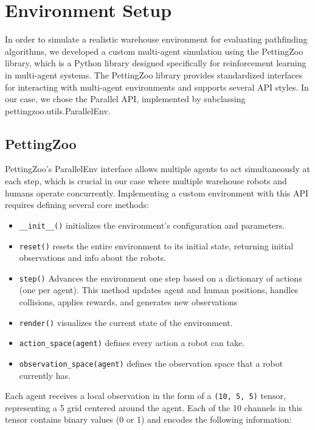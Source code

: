 \documentclass{kththesis}
\begin{document}
\section{Environment Setup}
In order to simulate a realistic warehouse environment for evaluating pathfinding algorithms, we developed a custom multi-agent simulation using the PettingZoo library, which is a Python library designed specifically for reinforcement learning in multi-agent systems. The PettingZoo library provides standardized interfaces for interacting with multi-agent environments and supports several API styles. In our case, we chose the Parallel API, implemented by subclassing pettingzoo.utils.ParallelEnv.


\subsection{PettingZoo}
PettingZoo's ParallelEnv interface allows multiple agents to act simultaneously at each step, which is crucial in our case where multiple warehouse robots and humans operate concurrently. Implementing a custom environment with this API requires defining several core methods:

\begin{itemize}
    \item \texttt{\_\_init\_\_()} initializes the environment's configuration and parameters.

    \item \texttt{reset()} resets the entire environment to its initial state, returning initial observations and info about the robots.

    \item \texttt{step()} Advances the environment one step based on a dictionary of actions (one per agent). This method updates agent and human positions, handles collisions, applies rewards, and generates new observations

    \item \texttt{render()} visualizes the current state of the environment.

    \item \texttt{action\_space(agent)} defines every action a robot can take.

    \item \texttt{observation\_space(agent)} defines the observation space that a robot currently has.
\end{itemize}

Each agent receives a local observation in the form of a \texttt{(10, 5, 5)} tensor, representing a 5 grid centered around the agent. Each of the 10 channels in this tensor contains binary values (0 or 1) and encodes the following information:
\end{document}
